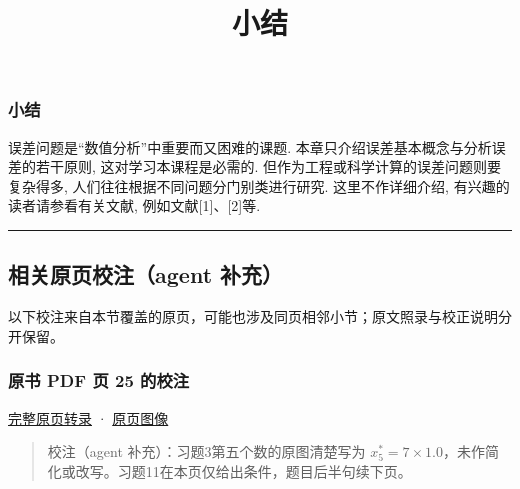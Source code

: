 \documentclass[
  10pt,
  fontset=fandol]{ctexart}
\title{小结}
\author{}
\date{}
\begin{document}
\maketitle

\subsubsection{小结}\label{ux5c0fux7ed3}

误差问题是``数值分析''中重要而又困难的课题. 本章只介绍误差基本概念与分析误差的若干原则, 这对学习本课程是必需的. 但作为工程或科学计算的误差问题则要复杂得多, 人们往往根据不同问题分门别类进行研究. 这里不作详细介绍, 有兴趣的读者请参看有关文献, 例如文献{[}1{]}、{[}2{]}等.

\begin{center}\rule{0.5\linewidth}{0.5pt}\end{center}

\subsection{相关原页校注（agent 补充）}\label{ux76f8ux5173ux539fux9875ux6821ux6ce8agent-ux8865ux5145}

以下校注来自本节覆盖的原页，可能也涉及同页相邻小节；原文照录与校正说明分开保留。

\subsubsection{原书 PDF 页 25 的校注}\label{ux539fux4e66-pdf-ux9875-25-ux7684ux6821ux6ce8}

\href{../pages/pdf-025.md}{完整原页转录} · \href{../../source-images/pdf-025.jpeg}{原页图像}

\begin{quote}
校注（agent 补充）：习题3第五个数的原图清楚写为 \(x_5^*=7\times1.0\)，未作简化或改写。习题11在本页仅给出条件，题目后半句续下页。
\end{quote}
\end{document}
